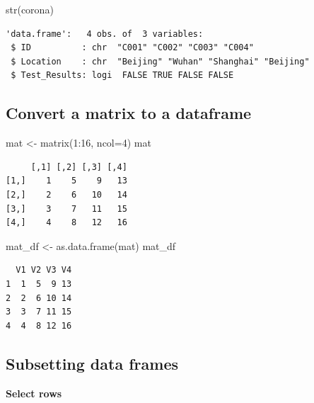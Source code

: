 \documentclass[
  letterpaper,
  DIV=11,
  numbers=noendperiod]{scrreprt}
\newenvironment{Shaded}{\begin{snugshade}}{\end{snugshade}}
\newcommand{\AttributeTok}[1]{\textcolor[rgb]{0.40,0.45,0.13}{#1}}
\newcommand{\DecValTok}[1]{\textcolor[rgb]{0.68,0.00,0.00}{#1}}
\newcommand{\FunctionTok}[1]{\textcolor[rgb]{0.28,0.35,0.67}{#1}}
\newcommand{\NormalTok}[1]{\textcolor[rgb]{0.00,0.23,0.31}{#1}}
\newcommand{\OtherTok}[1]{\textcolor[rgb]{0.00,0.23,0.31}{#1}}
\newcommand{\SpecialCharTok}[1]{\textcolor[rgb]{0.37,0.37,0.37}{#1}}
\begin{document}
\begin{Shaded}
\begin{Highlighting}[]
\FunctionTok{str}\NormalTok{(corona)}
\end{Highlighting}
\end{Shaded}

\begin{verbatim}
'data.frame':   4 obs. of  3 variables:
 $ ID          : chr  "C001" "C002" "C003" "C004"
 $ Location    : chr  "Beijing" "Wuhan" "Shanghai" "Beijing"
 $ Test_Results: logi  FALSE TRUE FALSE FALSE
\end{verbatim}

\subsection{Convert a matrix to a
dataframe}\label{convert-a-matrix-to-a-dataframe}

\begin{Shaded}
\begin{Highlighting}[]
\NormalTok{mat }\OtherTok{\textless{}{-}} \FunctionTok{matrix}\NormalTok{(}\DecValTok{1}\SpecialCharTok{:}\DecValTok{16}\NormalTok{, }\AttributeTok{ncol=}\DecValTok{4}\NormalTok{)}
\NormalTok{mat}
\end{Highlighting}
\end{Shaded}

\begin{verbatim}
     [,1] [,2] [,3] [,4]
[1,]    1    5    9   13
[2,]    2    6   10   14
[3,]    3    7   11   15
[4,]    4    8   12   16
\end{verbatim}

\begin{Shaded}
\begin{Highlighting}[]
\NormalTok{mat\_df }\OtherTok{\textless{}{-}} \FunctionTok{as.data.frame}\NormalTok{(mat)}
\NormalTok{mat\_df}
\end{Highlighting}
\end{Shaded}

\begin{verbatim}
  V1 V2 V3 V4
1  1  5  9 13
2  2  6 10 14
3  3  7 11 15
4  4  8 12 16
\end{verbatim}

\subsection{Subsetting data frames}\label{subsetting-data-frames}

\textbf{Select rows}
\end{document}
